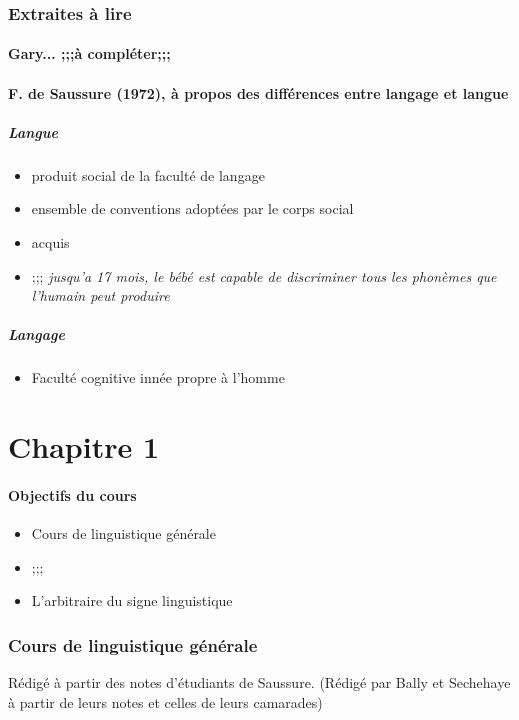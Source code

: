 
\section{Extraites à lire}
\subsection{Gary... ;;;à compléter;;;}
\subsection{F. de Saussure (1972), à propos des différences entre langage et langue}
\subsubsection{Langue}
\begin{itemize}
   \item produit social de la faculté de langage
   \item ensemble de conventions adoptées par le corps social
   \item acquis
   \item ;;; \textit{jusqu'a 17 mois, le bébé est capable de discriminer tous les phonèmes que l'humain peut produire}
\end{itemize}
\subsubsection{Langage}
\begin{itemize}
   \item Faculté cognitive innée propre à l'homme
\end{itemize}

\part{Chapitre 1}
\subsection{Objectifs du cours}
\begin{itemize}
   \item Cours de linguistique générale
   \item ;;;
   \item L'arbitraire du signe linguistique
\end{itemize}

\section{Cours de linguistique générale}
Rédigé à partir des notes d'étudiants de Saussure. (Rédigé par Bally et Sechehaye à partir de leurs notes et celles de leurs camarades)

